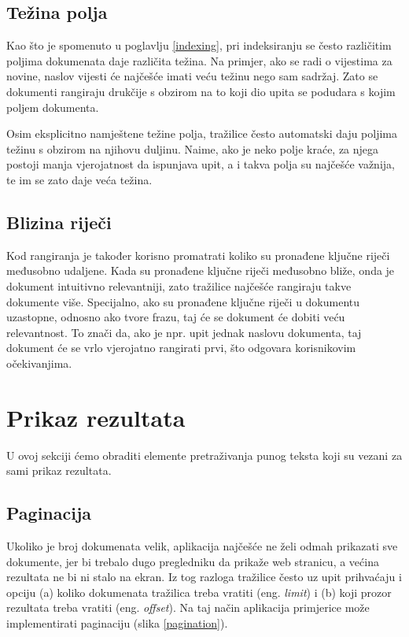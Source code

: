 \documentclass[a4paper,twoside,12pt]{scrreprt}
\begin{document}
\subsection{Težina polja}

Kao što je spomenuto u poglavlju \ref{indexing}, pri indeksiranju se često različitim poljima dokumenata daje različita težina. Na primjer, ako se radi o vijestima za novine, naslov vijesti će najčešće imati veću težinu nego sam sadržaj. Zato se dokumenti rangiraju drukčije s obzirom na to koji dio upita se podudara s kojim poljem dokumenta.

Osim eksplicitno namještene težine polja, tražilice često automatski daju poljima težinu s obzirom na njihovu duljinu. Naime, ako je neko polje kraće, za njega postoji manja vjerojatnost da ispunjava upit, a i takva polja su najčešće važnija, te im se zato daje veća težina.

\subsection{Blizina riječi}

Kod rangiranja je također korisno promatrati koliko su pronađene ključne riječi međusobno udaljene. Kada su pronađene ključne riječi međusobno bliže, onda je dokument intuitivno relevantniji, zato tražilice najčešće rangiraju takve dokumente više. Specijalno, ako su pronađene ključne riječi u dokumentu uzastopne, odnosno ako tvore frazu, taj će se dokument će dobiti veću relevantnost. To znači da, ako je npr. upit jednak naslovu dokumenta, taj dokument će se vrlo vjerojatno rangirati prvi, što odgovara korisnikovim očekivanjima.

\section{Prikaz rezultata}

U ovoj sekciji ćemo obraditi elemente pretraživanja punog teksta koji su vezani za sami prikaz rezultata.

\subsection{Paginacija}

Ukoliko je broj dokumenata velik, aplikacija najčešće ne želi odmah prikazati sve dokumente, jer bi trebalo dugo pregledniku da prikaže web stranicu, a većina rezultata ne bi ni stalo na ekran. Iz tog razloga tražilice često uz upit prihvaćaju i opciju (a) koliko dokumenata tražilica treba vratiti (eng. \textit{limit}) i (b) koji prozor rezultata treba vratiti (eng. \textit{offset}). Na taj način aplikacija primjerice može implementirati paginaciju (slika \ref{pagination}).
\end{document}
